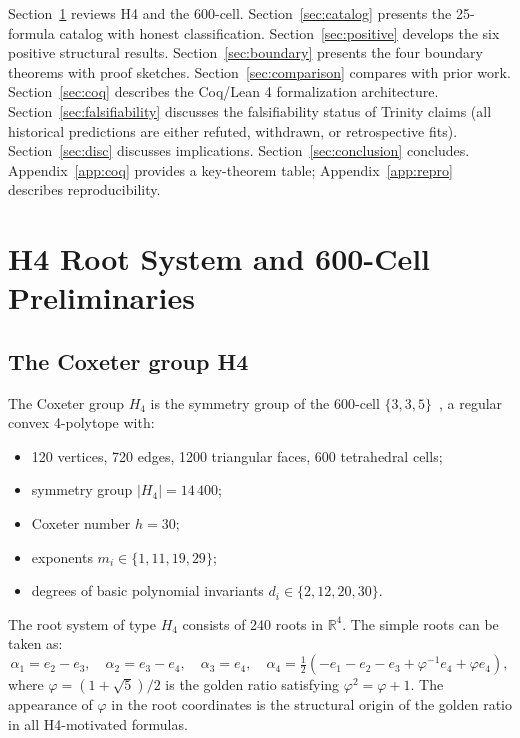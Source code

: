 \documentclass[12pt,a4paper]{article}
\begin{document}
Section~\ref{sec:h4} reviews H4 and the 600-cell. Section~\ref{sec:catalog} presents the 25-formula
catalog with honest classification. Section~\ref{sec:positive} develops the six positive
structural results. Section~\ref{sec:boundary} presents the four boundary theorems with proof sketches.
Section~\ref{sec:comparison} compares with prior work. Section~\ref{sec:coq} describes the
Coq/Lean 4 formalization architecture. Section~\ref{sec:falsifiability} discusses the falsifiability status
of Trinity claims (all historical predictions are either refuted, withdrawn, or retrospective fits). Section~\ref{sec:disc} discusses implications. Section~\ref{sec:conclusion}
concludes. Appendix~\ref{app:coq} provides a key-theorem table; Appendix~\ref{app:repro}
describes reproducibility.


\section{H4 Root System and 600-Cell Preliminaries}
\label{sec:h4}

\subsection{The Coxeter group H4}

The Coxeter group \(H_4\) is the symmetry group of the 600-cell
\(\{3,3,5\}\)~\cite{Coxeter:1973}, a regular convex 4-polytope with:
\begin{itemize}
  \item 120 vertices, 720 edges, 1200 triangular faces, 600 tetrahedral cells;
  \item symmetry group \(|H_4| = 14\,400\);
  \item Coxeter number \(h = 30\);
  \item exponents \(m_i \in \{1, 11, 19, 29\}\);
  \item degrees of basic polynomial invariants \(d_i \in \{2, 12, 20, 30\}\).
\end{itemize}

The root system of type \(H_4\) consists of 240 roots in \(\mathbb{R}^4\). The simple roots
can be taken as:
\begin{equation}
  \alpha_1 = e_2 - e_3,\quad
  \alpha_2 = e_3 - e_4,\quad
  \alpha_3 = e_4,\quad
  \alpha_4 = \tfrac{1}{2}(-e_1 - e_2 - e_3 + \varphi^{-1} e_4 + \varphi e_4),
  \label{eq:h4roots}
\end{equation}
where \(\varphi = (1+\sqrt{5})/2\) is the golden ratio satisfying \(\varphi^2 = \varphi + 1\).
The appearance of \(\varphi\) in the root coordinates is the structural origin of the golden
ratio in all H4-motivated formulas.
\end{document}
